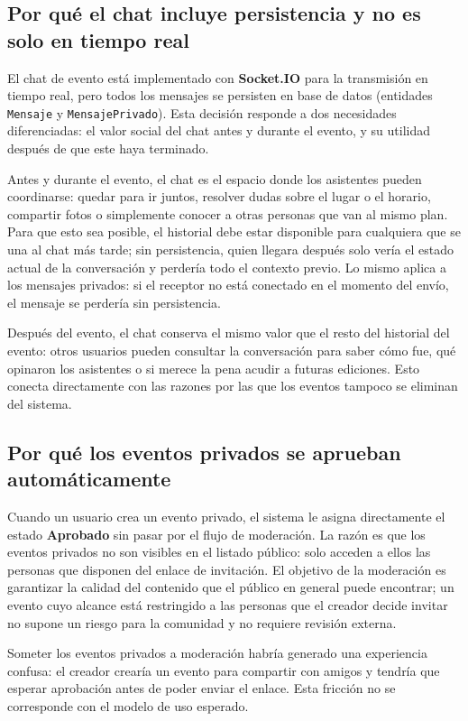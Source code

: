 \subsection{Por qué el chat incluye persistencia y no es solo en tiempo real}

El chat de evento está implementado con \textbf{Socket.IO} para la transmisión en tiempo real, pero todos los mensajes se persisten en base de datos (entidades \texttt{Mensaje} y \texttt{MensajePrivado}). Esta decisión responde a dos necesidades diferenciadas: el valor social del chat antes y durante el evento, y su utilidad después de que este haya terminado.

Antes y durante el evento, el chat es el espacio donde los asistentes pueden coordinarse: quedar para ir juntos, resolver dudas sobre el lugar o el horario, compartir fotos o simplemente conocer a otras personas que van al mismo plan. Para que esto sea posible, el historial debe estar disponible para cualquiera que se una al chat más tarde; sin persistencia, quien llegara después solo vería el estado actual de la conversación y perdería todo el contexto previo. Lo mismo aplica a los mensajes privados: si el receptor no está conectado en el momento del envío, el mensaje se perdería sin persistencia.

Después del evento, el chat conserva el mismo valor que el resto del historial del evento: otros usuarios pueden consultar la conversación para saber cómo fue, qué opinaron los asistentes o si merece la pena acudir a futuras ediciones. Esto conecta directamente con las razones por las que los eventos tampoco se eliminan del sistema.

\subsection{Por qué los eventos privados se aprueban automáticamente}

Cuando un usuario crea un evento privado, el sistema le asigna directamente el estado \textbf{Aprobado} sin pasar por el flujo de moderación. La razón es que los eventos privados no son visibles en el listado público: solo acceden a ellos las personas que disponen del enlace de invitación. El objetivo de la moderación es garantizar la calidad del contenido que el público en general puede encontrar; un evento cuyo alcance está restringido a las personas que el creador decide invitar no supone un riesgo para la comunidad y no requiere revisión externa.

Someter los eventos privados a moderación habría generado una experiencia confusa: el creador crearía un evento para compartir con amigos y tendría que esperar aprobación antes de poder enviar el enlace. Esta fricción no se corresponde con el modelo de uso esperado.

